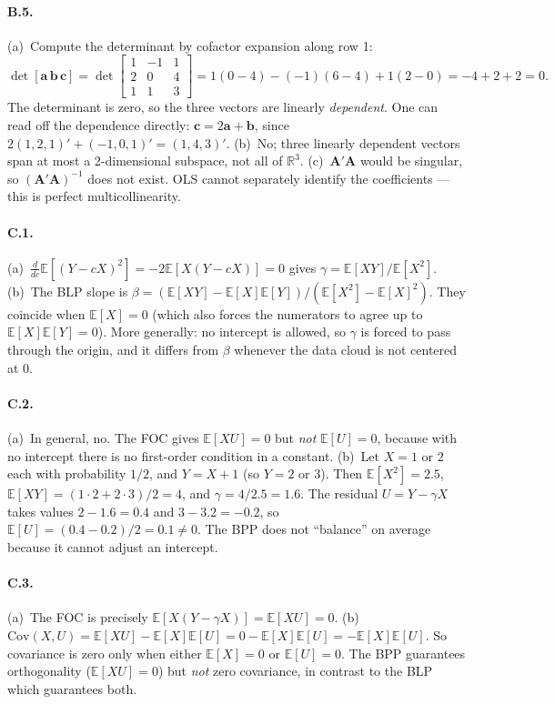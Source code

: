 \documentclass{article}
\newcommand{\E}{\mathbb{E}}
\begin{document}
\paragraph{B.5.}  (a)~Compute the determinant by cofactor expansion along row 1:
$$\det[\bm{a}\,\bm{b}\,\bm{c}] = \det\begin{bmatrix}1 & -1 & 1\\ 2 & 0 & 4\\ 1 & 1 & 3\end{bmatrix} = 1(0 - 4) - (-1)(6 - 4) + 1(2 - 0) = -4 + 2 + 2 = 0.$$
The determinant is zero, so the three vectors are linearly \emph{dependent}.  One can read off the dependence directly: $\bm{c} = 2\bm{a} + \bm{b}$, since $2(1,2,1)' + (-1, 0, 1)' = (1, 4, 3)'$.  (b)~No; three linearly dependent vectors span at most a 2-dimensional subspace, not all of $\mathbb{R}^3$.  (c)~$\bm{A}'\bm{A}$ would be singular, so $(\bm{A}'\bm{A})^{-1}$ does not exist.  OLS cannot separately identify the coefficients --- this is perfect multicollinearity.

\bigskip

\paragraph{C.1.}  (a)~$\frac{d}{dc}\E[(Y - cX)^2] = -2\E[X(Y - cX)] = 0$ gives $\gamma = \E[XY]/\E[X^2]$.  (b)~The BLP slope is $\beta = (\E[XY] - \E[X]\E[Y])/(\E[X^2] - \E[X]^2)$.  They coincide when $\E[X] = 0$ (which also forces the numerators to agree up to $\E[X]\E[Y] = 0$).  More generally: no intercept is allowed, so $\gamma$ is forced to pass through the origin, and it differs from $\beta$ whenever the data cloud is not centered at $0$.

\paragraph{C.2.}  (a)~In general, no.  The FOC gives $\E[XU] = 0$ but \emph{not} $\E[U] = 0$, because with no intercept there is no first-order condition in a constant.  (b)~Let $X = 1$ or $2$ each with probability $1/2$, and $Y = X + 1$ (so $Y = 2$ or $3$).  Then $\E[X^2] = 2.5$, $\E[XY] = (1\cdot 2 + 2\cdot 3)/2 = 4$, and $\gamma = 4/2.5 = 1.6$.  The residual $U = Y - \gamma X$ takes values $2 - 1.6 = 0.4$ and $3 - 3.2 = -0.2$, so $\E[U] = (0.4 - 0.2)/2 = 0.1 \neq 0$.  The BPP does not ``balance'' on average because it cannot adjust an intercept.

\paragraph{C.3.}  (a)~The FOC is precisely $\E[X(Y - \gamma X)] = \E[XU] = 0$.  (b)~$\text{Cov}(X, U) = \E[XU] - \E[X]\E[U] = 0 - \E[X]\E[U] = -\E[X]\E[U]$.  So covariance is zero only when either $\E[X] = 0$ or $\E[U] = 0$.  The BPP guarantees orthogonality ($\E[XU] = 0$) but \emph{not} zero covariance, in contrast to the BLP which guarantees both.
\end{document}
